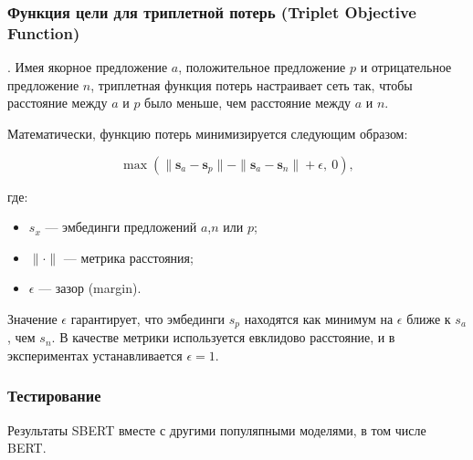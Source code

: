   \subsubsection{Функция цели для триплетной потерь (Triplet Objective Function)}.
Имея якорное предложение 
$a$, положительное предложение $p$ и отрицательное предложение 
$n$, триплетная функция потерь настраивает сеть так, чтобы расстояние между $a$ и $p$ было меньше, чем расстояние между $a$ и $n$.

Математически, функцию потерь минимизируется следующим образом:

\begin{equation}
\max\left( \|\mathbf{s}_a - \mathbf{s}_p\| - \|\mathbf{s}_a - \mathbf{s}_n\| + \epsilon,\ 0 \right),
\end{equation}

где:
\begin{itemize}
    \item $s_x$ — эмбединги предложений $a$,$n$ или $p$;
    \item  $\|{\cdot}\|$ — метрика расстояния;
    \item  $\epsilon$ — зазор (margin).
\end{itemize}  

Значение $\epsilon$ гарантирует, что эмбединги $s_p$ находятся как минимум на $\epsilon$ ближе к $s_a$, чем $s_n$. В качестве метрики используется евклидово расстояние, и в экспериментах устанавливается $\epsilon = 1$.


 \subsubsection{Тестирование}
Результаты SBERT вместе с другими популяпными моделями, в том числе BERT.

